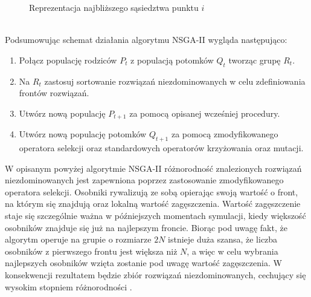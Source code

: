 \documentclass[twoside]{iisthesis}
\begin{document}
\begin{figure}[!htb]
	\centering
	\caption{Reprezentacja najbliższego sąsiedztwa punktu $i$}
	\label{fig:nsga2_cd}
\end{figure}
\\Podsumowując schemat działania algorytmu NSGA-II wygląda następująco:\\
\begin{enumerate}
	\item Połącz populację rodziców $P_{t}$ z populacją potomków $Q_{t}$ tworząc grupę $R_{t}$.
	\item Na $R_{t}$ zastosuj sortowanie rozwiązań niezdominowanych w celu zdefiniowania frontów rozwiązań.
	\item Utwórz nową populację $P_{t+1}$ za pomocą opisanej wcześniej procedury.
	\item Utwórz nową populację potomków $Q_{t+1}$ za pomocą zmodyfikowanego operatora selekcji oraz standardowych operatorów krzyżowania oraz mutacji.\\
\end{enumerate}

W opisanym powyżej algorytmie NSGA-II różnorodność znalezionych rozwiązań niezdominowanych jest zapewniona poprzez zastosowanie zmodyfikowanego operatora selekcji. Osobniki rywalizują ze sobą opierając swoją wartość o front, na którym się znajdują oraz lokalną wartość zagęszczenia. Wartość zagęszczenie staje się szczególnie ważna w późniejszych momentach symulacji, kiedy większość osobników znajduje się już na najlepszym froncie. Biorąc pod uwagę fakt, że algorytm operuje na grupie o rozmiarze $2N$ istnieje duża szansa, że liczba osobników z pierwszego frontu jest większa niż $N$, a więc w celu wybrania najlepszych osobników wzięta zostanie pod uwagę wartość zagęszczenia. W konsekwencji rezultatem będzie zbiór rozwiązań niezdominowanych, cechujący się wysokim stopniem różnorodności \cite{nsga}.
\end{document}
